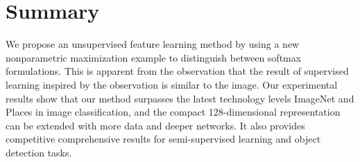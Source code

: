 \documentclass[a4paper,12pt]{article}
\begin{document}
 \section{Summary}
 We propose an unsupervised feature learning method by using a new nonparametric maximization example to distinguish between softmax formulations. This is apparent from the observation that the result of supervised learning inspired by the observation is similar to the image. Our experimental results show that our method surpasses the latest technology levels ImageNet and Places in image classification, and the compact 128-dimensional representation can be extended with more data and deeper networks. It also provides competitive comprehensive results for semi-supervised learning and object detection tasks.
 

%  
%
 
\end{document}

